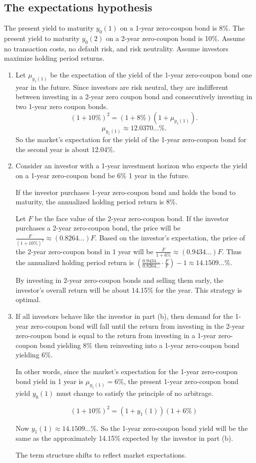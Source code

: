 \documentclass[12pt]{article}
\begin{document}
\subsection{The expectations hypothesis}
The present yield to maturity $y_0(1)$ on a 1-year zero-coupon bond is 8\%. The present yield to maturity $y_0(2)$ on a 2-year zero-coupon bond is 10\%. Assume no transaction costs, no default risk, and risk neutrality. Assume investors maximize holding period returns.
\begin{enumerate}
\item Let $\mu_{y_1(1)}$ be the expectation of the yield of the 1-year zero-coupon bond one year in the future. Since investors are risk neutral, they are indifferent between investing in a 2-year zero coupon bond and consecutively investing in two 1-year zero coupon bonds.
\[\left(1+10\%\right)^2=\left(1+8\%\right)\left(1+\mu_{y_1(1)}\right).\]
\[\mu_{y_1(1)}\approx 12.0370\dots\%.\]
So the market's expectation for the yield of the 1-year zero-coupon bond for the second year is about 12.04\%.
\item Consider an investor with a 1-year investment horizon who expects the yield on a 1-year zero-coupon bond be 6\% 1 year in the future. 

If the investor purchases 1-year zero-coupon bond and holds the bond to maturity, the annualized holding period return is 8\%.

Let $F$ be the face value of the 2-year zero-coupon bond. If the investor purchases a 2-year zero-coupon bond, the price will be $\frac{F}{(1+10\%)^2}\approx(0.8264\dots)F$. Based on the investor's expectation, the price of the 2-year zero-coupon bond in 1 year will be $\frac{F}{1+6\%}\approx(0.9434\dots)F$. Thus the annualized holding period return is $\left(\frac{0.9434\dots}{0.8264\dots}\cdot\frac{F}{F}\right)-1\approx 14.1509\dots\%.$

By investing in 2-year zero-coupon bonds and selling them early, the investor's overall return will be about 14.15\% for the year. This strategy is optimal.
\item If all investors behave like the investor in part (b), then demand for the 1-year zero-coupon bond will fall until the return from investing in the 2-year zero-coupon bond is equal to the return from investing in a 1-year zero-coupon bond yielding 8\% then reinvesting into a 1-year zero-coupon bond yielding 6\%. 

In other words, since the market's expectation for the 1-year zero-coupon bond yield in 1 year is $\mu_{y_1(1)}=6\%$, the present 1-year zero-coupon bond yield $y_0(1)$ must change to satisfy the principle of no arbitrage.

\[(1+10\%)^2=\left(1+y_1(1)\right)(1+6\%)\]

Now $y_1(1)\approx 14.1509\dots\%$. So the 1-year zero-coupon bond yield will be the same as the approximately 14.15\% expected by the investor in part (b).

The term structure shifts to reflect market expectations.
\end{enumerate}
\end{document}
